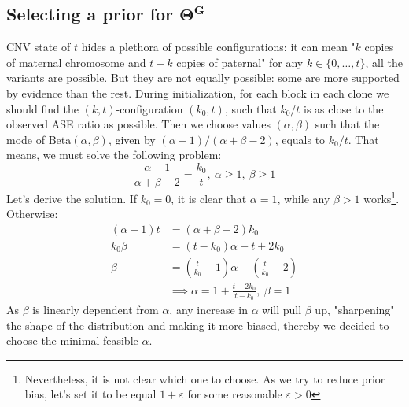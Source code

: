 \documentclass[11pt,a4paper,fullpage]{article}
\def\eps{\varepsilon}
\def\ge{\geqslant}
\theoremstyle{definition}
\theoremstyle{definition}
\theoremstyle{definition}
\numberwithin{equation}{section}
\begin{document}
	\subsection{Selecting a prior for $\mathbf{\Theta^G}$}
	CNV state of $t$ hides a plethora of possible configurations: it can mean "$ k $ copies of maternal chromosome and $ t - k $ copies of paternal" for any $ k \in \{0, \ldots, t\} $, all the variants are possible. But they are not equally possible: some are more supported by evidence than the rest. During initialization, for each block in each clone we should find the $ (k, t) $-configuration $ (k_0, t) $, such that $ k_0 / t $ is as close to the observed ASE ratio as possible. Then we choose values $ (\alpha, \beta) $ such that the mode of $ \mathrm{Beta}(\alpha, \beta) $, given by $ (\alpha - 1) / (\alpha + \beta - 2) $, equals to $ k_0 / t $. That means, we must solve the following problem:
	$$
	\dfrac{\alpha - 1}{\alpha + \beta - 2} = \frac{k_0}{t},\ \alpha \ge 1,\ \beta \ge 1
	$$
	Let's derive the solution. If $ k_0 = 0 $, it is clear that $ \alpha = 1 $, while any $ \beta > 1 $ works\footnote{Nevertheless, it is not clear which one to choose. As we try to reduce prior bias, let's set it to be equal $ 1 + \eps $  for some reasonable $ \eps > 0 $}. Otherwise:
	\begin{equation}
	\begin{aligned}
	(\alpha - 1) t &= (\alpha + \beta - 2) k_0\\
	k_0 \beta &= (t - k_0) \alpha -t + 2 k_0\\
	\beta &= \left (\frac{t}{k_0} - 1\right ) \alpha - \left (\frac{t}{k_0} - 2 \right )\\
	&\implies \alpha = 1 + \frac{t - 2k_0}{t - k_0},\ \beta = 1
	\end{aligned}
	\end{equation}
	As $ \beta $ is linearly dependent from $ \alpha $, any increase in $ \alpha $ will pull $ \beta $ up, "sharpening" the shape of the distribution and making it more biased, thereby we decided to choose the minimal feasible $ \alpha $.
\end{document}
